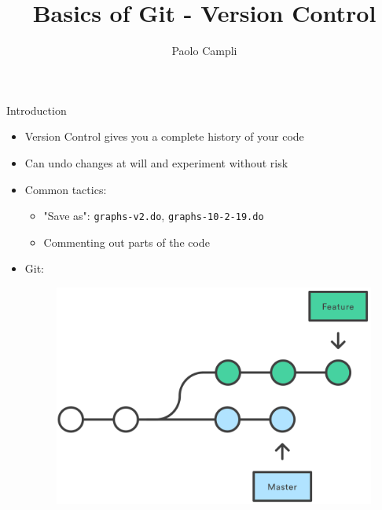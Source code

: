 \documentclass[12pt]{beamer}
\begin{document}
	\author{Paolo Campli}
		\vspace{1cm}
	\title{Basics of Git - Version Control}

	\begin{frame}[plain]
	\maketitle
	\end{frame}


\begin{frame}{Introduction}
\begin{itemize}
	\item Version Control gives you a complete history of your code
	\vspace{.1cm}
	\item Can undo changes at will and experiment without risk
	
	\vspace{.4cm}
	\item Common tactics:  
	\begin{itemize}
		\item "Save as": \texttt{graphs-v2.do}, \texttt{graphs-10-2-19.do} 
		
		\item Commenting out parts of the code
	\end{itemize}
	\vspace{.1cm}
	\item Git: 
	\begin{figure}
		\includegraphics[scale=0.12]{figures/Git-Forked-History1.png}
	\end{figure}
\end{itemize}

\end{frame}
\end{document}
